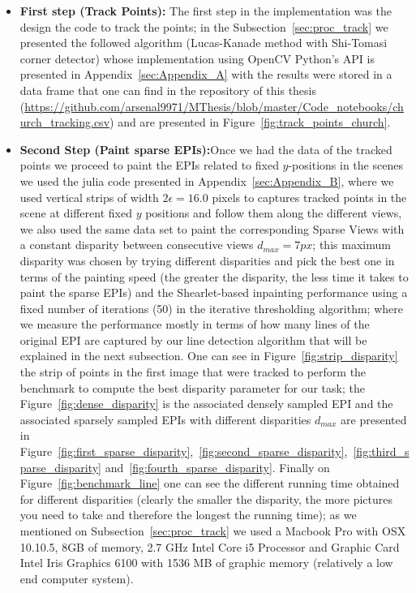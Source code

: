\bigskip

\begin{itemize}

\item \textbf{First step (Track Points):} The first step in the implementation was the design the code to track the points; in the Subsection~\ref{sec:proc_track} we presented the followed algorithm (Lucas-Kanade method with Shi-Tomasi corner detector) whose implementation using OpenCV Python's API is presented in Appendix~\ref{sec:Appendix_A} with the results were stored in a data frame that one can find in the repository of this thesis (\url{https://github.com/arsenal9971/MThesis/blob/master/Code_notebooks/church_tracking.csv}) and are presented in Figure~\ref{fig:track_points_church}.

\bigskip

\item \textbf{Second Step (Paint sparse EPIs):}Once we had the data of the tracked points we proceed to paint the EPIs related to fixed $y$-positions in the scenes we used the julia code presented in Appendix~\ref{sec:Appendix_B}, where we used vertical strips of width $2\epsilon=16.0$ pixels to captures tracked points in the scene at different fixed $y$ positions and follow them along the different views, we also used the same data set to paint the corresponding Sparse Views with a constant disparity between consecutive views $d_{max}=7px$; this maximum disparity was chosen by trying different disparities and pick the best one in terms of the painting speed (the greater the disparity, the less time it takes to paint the sparse EPIs) and the Shearlet-based inpainting performance using a fixed number of iterations (50) in the iterative thresholding algorithm; where we measure the performance mostly in terms of how many lines of the original EPI are captured by our line detection algorithm that will be explained in the next subsection. One can see in Figure~\ref{fig:strip_disparity} the strip of points in the first image that were tracked to perform the benchmark to compute the best disparity parameter for our task; the Figure~\ref{fig:dense_disparity} is the associated densely sampled EPI and the associated sparsely sampled EPIs with different disparities $d_{max}$ are presented in Figure~\ref{fig:first_sparse_disparity},~\ref{fig:second_sparse_disparity},~\ref{fig:third_sparse_disparity} and~\ref{fig:fourth_sparse_disparity}. Finally on Figure~\ref{fig:benchmark_line} one can see the different running time obtained for different disparities (clearly the smaller the disparity, the more pictures you need to take and therefore the longest the running time); as we mentioned on Subsection~\ref{sec:proc_track} we used a Macbook Pro with OSX 10.10.5, 8GB of memory, 2.7 GHz Intel Core i5 Processor and Graphic Card Intel Iris Graphics 6100 with 1536 MB of graphic memory (relatively a low end computer system).


\end{itemize}

